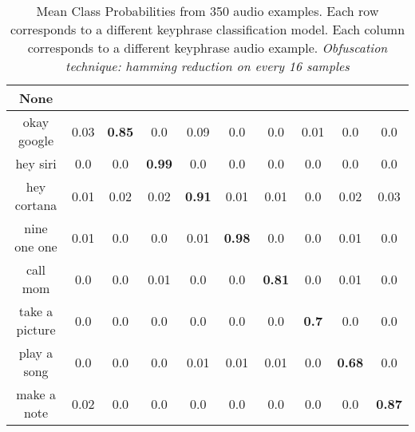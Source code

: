 \begin{table}[!th]
\begin{tabular}{cccccccccc}%
\hline%
None&\rotate{random talk}{70}&\rotate{okay google}{70}&\rotate{hey siri}{70}&\rotate{hey cortana}{70}&\rotate{nine one one}{70}&\rotate{call mom}{70}&\rotate{take a picture}{70}&\rotate{play a song}{70}&\rotate{make a note}{70}\\%
\hline%
okay google&0.03&\textbf{0.85}&0.0&0.09&0.0&0.0&0.01&0.0&0.0\\%
hey siri&0.0&0.0&\textbf{0.99}&0.0&0.0&0.0&0.0&0.0&0.0\\%
hey cortana&0.01&0.02&0.02&\textbf{0.91}&0.01&0.01&0.0&0.02&0.03\\%
nine one one&0.01&0.0&0.0&0.01&\textbf{0.98}&0.0&0.0&0.01&0.0\\%
call mom&0.0&0.0&0.01&0.0&0.0&\textbf{0.81}&0.0&0.01&0.0\\%
take a picture&0.0&0.0&0.0&0.0&0.0&0.0&\textbf{0.7}&0.0&0.0\\%
play a song&0.0&0.0&0.0&0.01&0.01&0.01&0.0&\textbf{0.68}&0.0\\%
make a note&0.02&0.0&0.0&0.0&0.0&0.0&0.0&0.0&\textbf{0.87}\\%
\hline%
\end{tabular}
\caption{Mean Class Probabilities from 350 audio examples. Each row corresponds to a different keyphrase classification model. Each column corresponds to a different keyphrase audio example. \emph{Obfuscation technique: hamming reduction on every 16 samples}}
\label{tab:probs_raw_audio_hamming_16}
\end{table}



\clearpage


